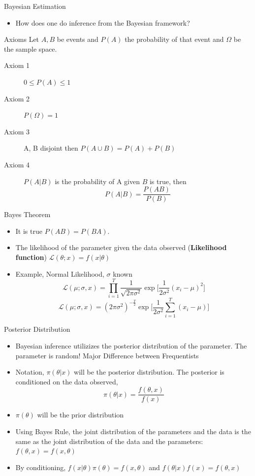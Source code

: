 \documentclass[table]{beamer}
\begin{document}
\begin{frame}{Bayesian Estimation}
	\begin{itemize}
		\item How does one do inference from the Bayesian framework?
	\end{itemize}
	\begin{block}{Axioms}
		Let $ A, B $ be events and $ P(A) $ the probability of that event and $ \Omega  $ be the sample space. 
		\begin{description}
			\item[Axiom 1] $ 0 \leq P(A) \leq 1 $
			\item[Axiom 2] $ P(\Omega) = 1 $
			\item[Axiom 3] A, B disjoint then $ P(A\cup B) = P(A) + P(B) $
			\item[Axiom 4] $ P(A|B)  $ is the probability of A given $ B $ is true, then \[ P(A|B) = \frac{P(AB)}{P(B)} \]
		\end{description}
	\end{block}
\end{frame}

\begin{frame}{Bayes Theorem}
	\begin{itemize} 
		\item It is true $ P(AB) = P(BA) $. 
		\item The likelihood of the parameter given the data observed  (\textbf{Likelihood function}) $  \mathscr{L}(\theta;x) = f(x|\theta) $
		\item Example, Normal Likelihood, $ \sigma $ known
		\[ \mathscr{L}(\mu ; \sigma, x) = \prod_{i=1}^{T} \frac{1}{\sqrt{2\pi\sigma^2}} \exp\Big[ \frac{1}{2\sigma^2} (x_i-\mu)^2 \Big]  \]
		\[\mathscr{L}(\mu ; \sigma, x) = (2\pi\sigma^2)^{-\frac{T}{2}} \exp\Big[\frac{1}{2\sigma^2} \sum_{i=1}^{T}(x_i - \mu)\Big]  \]
	\end{itemize}
\end{frame}

\begin{frame}{Posterior Distribution}
	\begin{itemize}
		\item Bayesian inference utilizizes the posterior distribution of the parameter. The parameter is random! Major Difference between Frequentists
		\item Notation, $ \pi(\theta|x)  $ will be the posterior distribution. The posterior is conditioned on the data observed,
		\[ \pi(\theta|x) = \frac{f(\theta,x)}{f(x)} \]
		\item $ \pi(\theta) $ will be the prior distribution
		\item Using Bayes Rule, the joint distribution of the parameters and the data is the same as the joint distribution of the data and the parameters: $ f(\theta, x) = f(x, \theta) $
		\item By conditioning, $ f(x|\theta)\pi(\theta) = f(x,\theta) $ and $ f(\theta|x)f(x) = f(\theta,x)$
	\end{itemize}
\end{frame}
\end{document}
